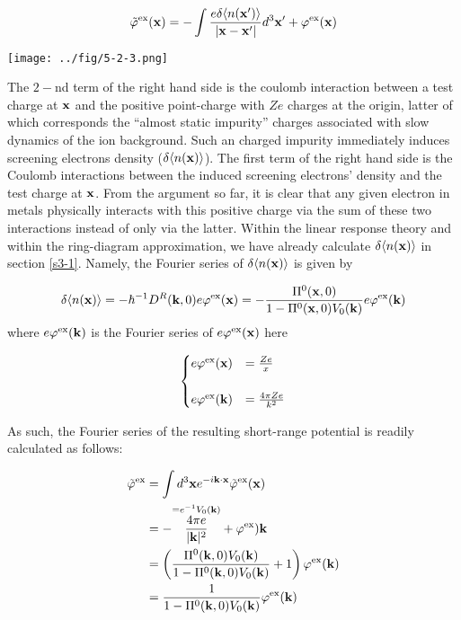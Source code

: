 \[\tilde\varphi^{\text{ex}}({\bf x})=-\int\frac{e\delta\langle n({\bf x}')\rangle}{|\bf x-x'|}d^3{\bf x'}+\varphi^{\text{ex}}({\bf x}) \]

\texttt{[image: ../fig/5-2-3.png]}

The $2-$nd term of the right hand side is the coulomb interaction between a test charge at $\bf x$ and the positive point-charge with $Ze$ charges at the origin, latter of which corresponds the ``almost static impurity'' charges associated with slow dynamics of the ion background. Such an charged impurity immediately induces screening electrons density ($\delta\langle n({\bf x})\rangle$). The first term of the right hand side is the Coulomb interactions between the induced screening electrons' density and the test charge at $\bf x$. From the argument so far, it is clear that any given electron in metals physically interacts with this positive charge via the sum of these two interactions instead of only via the latter. Within the linear response theory and within the ring-diagram approximation, we have already calculate $\delta\langle n({\bf x})\rangle$ in section \ref{s3-1}. Namely, the Fourier series of $\delta\langle n({\bf x})\rangle$ is given by

\[\delta\langle n({\bf x})\rangle =-\hbar^{-1}D^R({\bf k},0)e\varphi^{\text{ex}}({\bf x}) = -\frac{\Pi^0({\bf x},0)}{1- \Pi^0({\bf x},0)V_0({\bf k})}e\varphi^{\text{ex}}({\bf k})\]
where $e\varphi^{\text{ex}}({\bf k})$ is the Fourier series of $e\varphi^{\text{ex}}({\bf x})$ here

\[\begin{cases}
e\varphi^{\text{ex}}({\bf x}) &= \frac{Ze}{x}\\
&\\
e\varphi^{\text{ex}}({\bf k}) &= \frac{4\pi Ze}{k^2}
\end{cases}\]

As such, the Fourier series of the resulting short-range potential is readily calculated as follows:

\[\begin{split}
\tilde\varphi^{\text{ex}} &= \int d^3{\bf x} e^{-i\bf k\cdot x}\tilde\varphi^{\text{ex}}({\bf x})\\
&= -\overset{=e^{-1}V_0({\bf k})}{\frac{4\pi e}{|{\bf k}|^2}}+\varphi^{\text{ex}}){\bf k}\\
&=\left(\frac{\Pi^0({\bf k},0)V_0({\bf k})}{1 -\Pi^0({\bf k},0)V_0({\bf k})}+1\right)\varphi^{\text{ex}}({\bf k})\\
&= \frac{1}{1 - \Pi^0({\bf k},0)V_0({\bf k})}\varphi^{\text{ex}}({\bf k})
\end{split} \]


